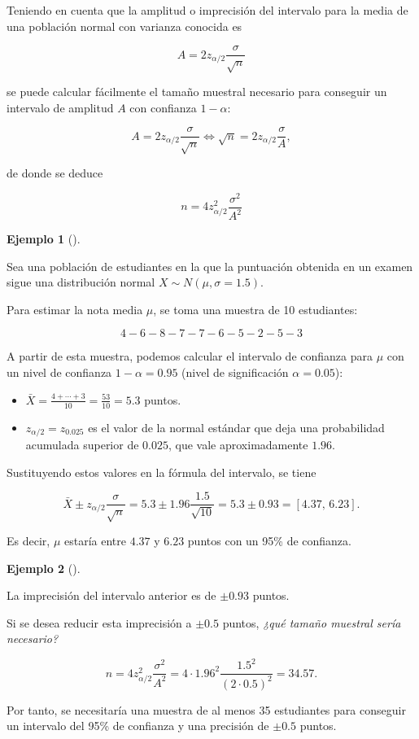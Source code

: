 \documentclass[
  spanish,
  a4paper,
]{scrreport}
\providecommand{\tightlist}{%
  \setlength{\itemsep}{0pt}\setlength{\parskip}{0pt}}
\theoremstyle{plain}
\theoremstyle{definition}
\newtheorem{example}{Ejemplo}[chapter]
\theoremstyle{definition}
\theoremstyle{remark}
\begin{document}
Teniendo en cuenta que la amplitud o imprecisión del intervalo para la
media de una población normal con varianza conocida es

\[
A= 2 z_{\alpha/2}\frac{\sigma}{\sqrt{n}}
\]

se puede calcular fácilmente el tamaño muestral necesario para conseguir
un intervalo de amplitud \(A\) con confianza \(1-\alpha\):

\[
A= 2 z_{\alpha/2}\frac{\sigma}{\sqrt{n}} \Leftrightarrow \sqrt{n}= 2 z_{\alpha/2}\frac{\sigma}{A},
\]

de donde se deduce

\[
{n = 4 z_{\alpha/2}^2\frac{\sigma^2}{A^2}}
\]

\begin{example}[]\protect\hypertarget{exm-intervalo-confianza-media}{}\label{exm-intervalo-confianza-media}

Sea una población de estudiantes en la que la puntuación obtenida en un
examen sigue una distribución normal \(X\sim N(\mu,\sigma=1.5)\).

Para estimar la nota media \(\mu\), se toma una muestra de 10
estudiantes:

\[
4 - 6 - 8 - 7 - 7 - 6 - 5 - 2 - 5 - 3
\]

A partir de esta muestra, podemos calcular el intervalo de confianza
para \(\mu\) con un nivel de confianza \(1-\alpha=0.95\) (nivel de
significación \(\alpha=0.05\)):

\begin{itemize}
\tightlist
\item
  \(\bar X = \frac{4+\cdots+3}{10}= \frac{53}{10} = 5.3\) puntos.
\item
  \(z_{\alpha/2}=z_{0.025}\) es el valor de la normal estándar que deja
  una probabilidad acumulada superior de \(0.025\), que vale
  aproximadamente \(1.96\).
\end{itemize}

Sustituyendo estos valores en la fórmula del intervalo, se tiene

\[
\bar{X}\pm z_{\alpha/2}\frac{\sigma}{\sqrt{n}} = 5.3\pm 1.96\frac{1.5}{\sqrt{10}} = 5.3\pm 0.93 = \left[4.37,\,6.23\right].
\]

Es decir, \(\mu\) estaría entre \(4.37\) y \(6.23\) puntos con un 95\%
de confianza.

\end{example}

\begin{example}[]\protect\hypertarget{exm-tamaño-muestral-media}{}\label{exm-tamaño-muestral-media}

La imprecisión del intervalo anterior es de \(\pm 0.93\) puntos.

Si se desea reducir esta imprecisión a \(\pm 0.5\) puntos, \emph{¿qué
tamaño muestral sería necesario?}

\[
n = 4 z_{\alpha/2}^2\frac{\sigma^2}{A^2} = 4\cdot 1.96^2\frac{1.5^2}{(2\cdot 0.5)^2} = 34.57.
\]

Por tanto, se necesitaría una muestra de al menos 35 estudiantes para
conseguir un intervalo del 95\% de confianza y una precisión de \(\pm
0.5\) puntos.

\end{example}
\end{document}
